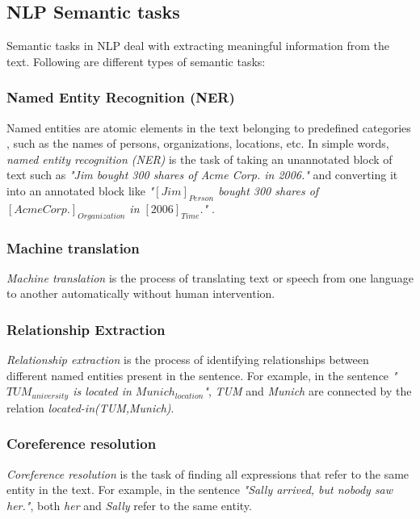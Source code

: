 \subsection{NLP Semantic tasks}

Semantic tasks in NLP deal with extracting meaningful information from the text. Following are different types of semantic tasks:

\subsubsection{Named Entity Recognition (NER)}

Named entities are atomic elements in the text belonging to predefined categories \cite{ner1}, such as the names of persons, organizations, locations, etc. In simple words, \textit{named entity recognition (NER)} is the task of taking an unannotated block of text such as \textit{"Jim bought 300 shares of Acme Corp. in 2006."} and converting it into an annotated block like \textit{"$[Jim]_{Person}$ bought 300 shares of $[Acme Corp.]_{Organization}$ in $[2006]_{Time}$."} \cite{wiki:ner}.

\subsubsection{Machine translation}

\textit{Machine translation} is the process of translating text or speech from one language to another automatically without human intervention.

\subsubsection{Relationship Extraction}\label{sec:RE}

\textit{Relationship extraction} is the process of identifying relationships between different named entities present in the sentence. For example, in the sentence \textit{"$TUM_{university}$ is located in $Munich_{location}$"}, \textit{TUM} and \textit{Munich} are connected by the relation \textit{located-in(TUM,Munich)}.

\subsubsection{Coreference resolution}

\textit{Coreference resolution} is the task of finding all expressions that refer to the same entity in the text. For example, in the sentence \textit{"Sally arrived, but nobody saw her."}, both \textit{her} and \textit{Sally} refer to the same entity.

